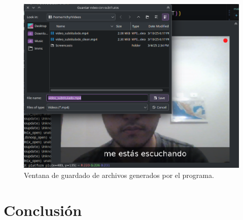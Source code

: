\documentclass[conference]{IEEEtran}
\begin{document}
\begin{figure}[ht]
    \centering
    \includegraphics[width=\columnwidth]{images/save-window.png}
    \caption{Ventana de guardado de archivos generados por el programa.}
    \label{fig:save-window}
\end{figure}

\section{Conclusión}


\nocite{calcularRangos}
\printbibliography
\end{document}
